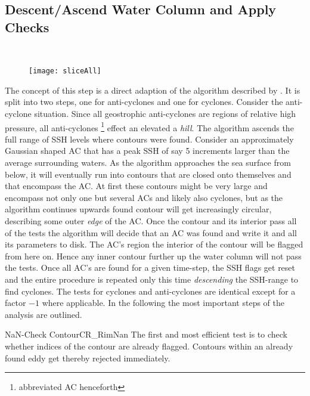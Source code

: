 \subsection{Descent/Ascend Water Column and Apply Checks}
 \\
\begin{figure}
	\texttt{[image: sliceAll]}
	\caption{}
	\label{fig:sliceAll}
\end{figure}
The concept of this step is a direct adaption of the algorithm described
by \citet{Chelton2011}. It is split into two steps, one for anti-cyclones and one
for cyclones. Consider \eg the anti-cyclone situation. Since all
geostrophic anti-cyclones are regions of relative high pressure, all
anti-cyclones \footnote{abbreviated AC henceforth} effect an elevated \SSH \ie
a \textit{hill}. The algorithm ascends the full range of SSH levels where
contours were found. Consider an approximately Gaussian shaped AC that has a
peak SSH of say 5 increments larger than the average surrounding waters.
As the algorithm approaches the sea surface from below, it will eventually run
into contours that are closed onto themselves and that encompass the AC. At
first these contours might be very large and encompass not only one but several
ACs and likely also cyclones, but as the algorithm continues upwards found
contour will get increasingly circular, describing some outer \textit{edge} of
the AC. Once the contour and its interior pass all of the tests the algorithm
will decide that an AC was found and write it and all its parameters to disk.
The AC's region \ie the interior of the contour will be flagged from here on.
Hence any inner contour further up the water column will not pass the tests.
Once all AC's are found for a given time-step, the SSH flags get reset and the
entire procedure is repeated only this time \textit{descending} the SSH-range to
find cyclones. The tests for cyclones and anti-cyclones are identical except for
a factor $-1$ where applicable. In the following the most important steps of the
analysis are
outlined.
\begin{filter}{NaN-Check Contour}{CR_RimNan}
The first and most efficient test is to check whether indices of the
contour are already flagged. Contours within an already found eddy get thereby
rejected immediately.
\end{filter}\newline

